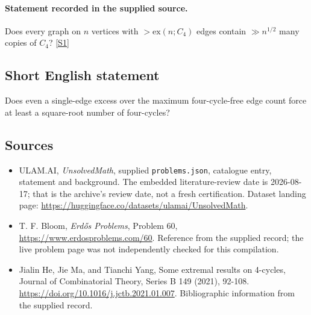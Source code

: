 \documentclass[11pt,a4paper]{article}
\newcommand{\sref}[2]{\hyperlink{source:#1:#2}{[S#2]}}
\begin{document}
\paragraph{Statement recorded in the supplied source.}
Does every graph on $n$ vertices with $>\mathrm{ex}(n;C_4)$ edges contain $\gg n^{1/2}$ many copies of $C_4$? \sref{statement}{1}

\subsection{Short English statement}

Does even a single-edge excess over the maximum four-cycle-free edge count force at least a square-root number of four-cycles?

\subsection{Sources}

{\small

\begin{itemize}

\item[\hypertarget{source:statement:1}{S1}] ULAM.AI, \emph{UnsolvedMath}, supplied \texttt{problems.json}, catalogue entry, statement and background. The embedded literature-review date is 2026-08-17; that is the archive’s review date, not a fresh certification. Dataset landing page: \url{https://huggingface.co/datasets/ulamai/UnsolvedMath}.

\item[\hypertarget{source:statement:2}{S2}] T. F. Bloom, \emph{Erdős Problems}, Problem 60, \url{https://www.erdosproblems.com/60}. Reference from the supplied record; the live problem page was not independently checked for this compilation.

\item[\hypertarget{source:statement:3}{S3}] Jialin He, Jie Ma, and Tianchi Yang, Some extremal results on 4-cycles, Journal of Combinatorial Theory, Series B 149 (2021), 92-108. \url{https://doi.org/10.1016/j.jctb.2021.01.007}. Bibliographic information from the supplied record.

\end{itemize}

}

\label{end:statement}
\end{document}
